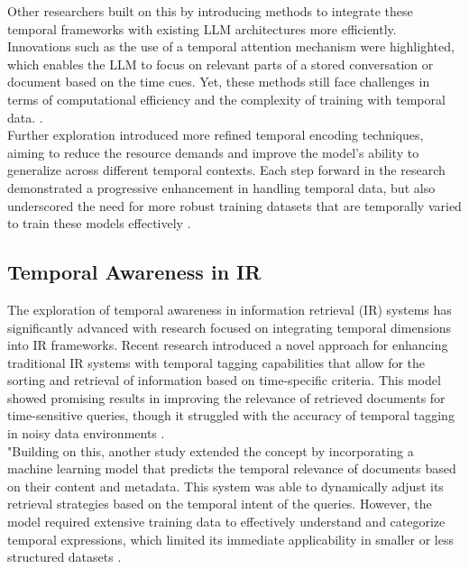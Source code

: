 Other researchers built on this by introducing methods to integrate these temporal frameworks with existing LLM architectures more efficiently. Innovations such as the use of a temporal attention mechanism were highlighted, which enables the LLM to focus on relevant parts of a stored conversation or document based on the time cues. Yet, these methods still face challenges in terms of computational efficiency and the complexity of training with temporal data. \parencite{zhang2024event,mann2020language}. \\

Further exploration introduced more refined temporal encoding techniques, aiming to reduce the resource demands and improve the model's ability to generalize across different temporal contexts. Each step forward in the research demonstrated a progressive enhancement in handling temporal data, but also underscored the need for more robust training datasets that are temporally varied to train these models effectively \parencite{kynoch2023recallm,dhingra2022time}.

\subsection{Temporal Awareness in IR}

The exploration of temporal awareness in information retrieval (IR) systems has significantly advanced with research focused on integrating temporal dimensions into IR frameworks. Recent research introduced a novel approach for enhancing traditional IR systems with temporal tagging capabilities that allow for the sorting and retrieval of information based on time-specific criteria. This model showed promising results in improving the relevance of retrieved documents for time-sensitive queries, though it struggled with the accuracy of temporal tagging in noisy data environments \parencite{moulahi2016time}. \\

"Building on this, another study extended the concept by incorporating a machine learning model that predicts the temporal relevance of documents based on their content and metadata. This system was able to dynamically adjust its retrieval strategies based on the temporal intent of the queries. However, the model required extensive training data to effectively understand and categorize temporal expressions, which limited its immediate applicability in smaller or less structured datasets \parencite{whiting2016temporal}. \\

